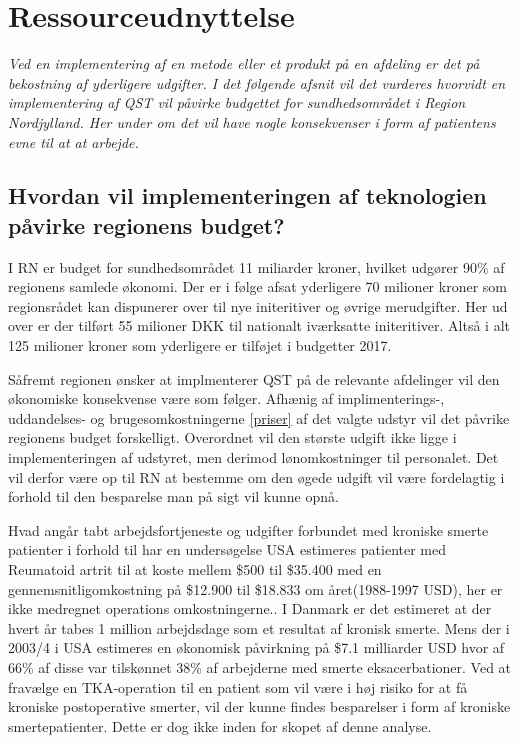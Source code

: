 \section{Ressourceudnyttelse}
\textit{Ved en implementering af en metode eller et produkt på en afdeling er det på bekostning af yderligere udgifter. I det følgende afsnit vil det vurderes hvorvidt en implementering af QST vil påvirke budgettet for sundhedsområdet i Region Nordjylland. Her under om det vil have nogle konsekvenser i form af patientens evne til at at arbejde.}
\subsection{Hvordan vil implementeringen af teknologien påvirke regionens budget?}
I RN er budget for sundhedsområdet 11 miliarder kroner, hvilket udgører 90\% af regionens samlede økonomi. \citep{RnBudget17}  Der er i følge  afsat yderligere 70 milioner kroner som regionsrådet kan dispunerer over til nye initeritiver og øvrige merudgifter. Her ud over er der tilført 55 milioner DKK til nationalt iværksatte initeritiver. Altså i alt 125 milioner kroner som yderligere er tilføjet i budgetter 2017.

Såfremt regionen ønsker at implmenterer QST på de relevante afdelinger vil den økonomiske konsekvense være som følger. Afhænig af implimenterings-, uddandelses- og brugesomkostningerne \ref{priser} af det valgte udstyr vil det påvrike regionens budget forskelligt. Overordnet vil den største udgift ikke ligge i implementeringen af udstyret, men derimod lønomkostninger til personalet. 
Det vil derfor være op til RN at bestemme om den øgede udgift vil være fordelagtig i forhold til den besparelse man på sigt vil kunne opnå.

Hvad angår tabt arbejdsfortjeneste og udgifter forbundet med kroniske smerte patienter i forhold til har en undersøgelse USA estimeres patienter med Reumatoid artrit til at koste mellem \$500 til \$35.400 med en gennemsnitligomkostning på \$12.900 til \$18.833  om året(1988-1997 USD), her er ikke medregnet operations omkostningerne.\citep{Turk2002}. I Danmark er det estimeret at der hvert år tabes 1 million arbejdsdage som et resultat af kronisk smerte.\citep{Eriksen2006} Mens der i 2003/4 i USA estimeres en økonomisk påvirkning på \$7.1 milliarder USD hvor af 66\% af disse var tilskønnet 38\% af arbejderne med smerte eksacerbationer. \citep{Phillips2009} Ved at fravælge en TKA-operation til en patient som vil være i høj risiko for at få kroniske postoperative smerter, vil der kunne findes besparelser i form af kroniske smertepatienter. Dette er dog ikke inden for skopet af denne analyse. 



